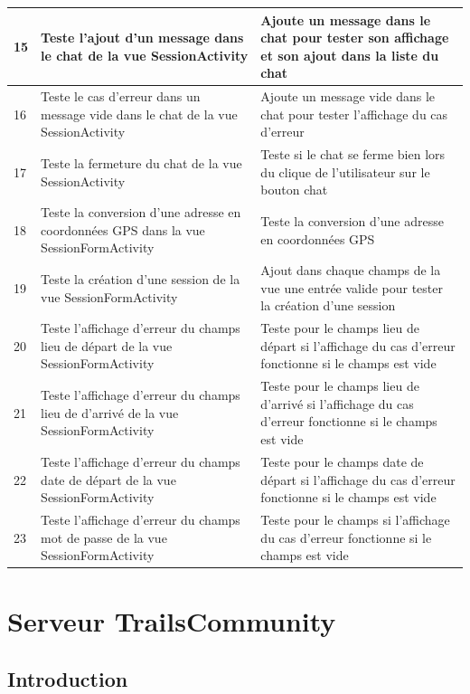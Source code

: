 \documentclass[titlepage, 12pt]{report}
\begin{document}
\begin{table}[ht]
\begin{tabularx}{\textwidth}{|X|X|X|}
\hline
15 & Teste l'ajout d'un message dans le chat de la vue SessionActivity & Ajoute un message dans le chat pour tester son affichage et son ajout dans la liste du chat  \\
\hline
16 & Teste le cas d'erreur dans un message vide dans le chat de la vue SessionActivity & Ajoute un message vide dans le chat pour tester l'affichage du cas d'erreur  \\
\hline
17 & Teste la fermeture du chat de la vue SessionActivity & Teste si le chat se ferme bien lors du clique de l'utilisateur sur le bouton chat  \\
\hline
18 & Teste la conversion d'une adresse en coordonnées GPS dans la vue SessionFormActivity & Teste la conversion d'une adresse en coordonnées GPS  \\
\hline
19 & Teste la création d'une session de la vue SessionFormActivity & Ajout dans chaque champs de la vue une entrée valide pour tester la création d'une session  \\
\hline
20 & Teste l'affichage d'erreur du champs lieu de départ de la vue SessionFormActivity & Teste pour le champs lieu de départ si l'affichage du cas d'erreur fonctionne si le champs est vide \\
\hline
21 & Teste l'affichage d'erreur du champs lieu de d'arrivé de la vue SessionFormActivity & Teste pour le champs lieu de d'arrivé si l'affichage du cas d'erreur fonctionne si le champs est vide \\
\hline
22 & Teste l'affichage d'erreur du champs date de départ de la vue SessionFormActivity & Teste pour le champs date de départ si l'affichage du cas d'erreur fonctionne si le champs est vide \\
\hline
23 & Teste l'affichage d'erreur du champs mot de passe de la vue SessionFormActivity & Teste pour le champs  si l'affichage du cas d'erreur fonctionne si le champs est vide \\
\hline \hline
\end{tabularx}
\end{table}


\part{Serveur TrailsCommunity}

\chapter{Introduction}
\end{document}
